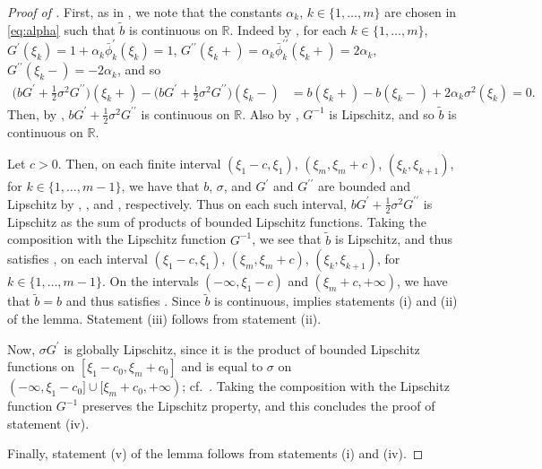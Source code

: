 \documentclass[onseside, final]{amsart}
\theoremstyle{definition}
\newcommand{\R}{\mathbb R}
\numberwithin{equation}{section}
\begin{document}
	\begin{proof}[Proof of ]
	 	First, as in \cite{LeSz17}, we note that the constants $\alpha_k$, $k \in \{1, \dotsc, m\}$ are chosen in \eqref{eq:alpha} such that $\tilde b$ is continuous on $\R$. Indeed by , for each $k \in \{1, \dotsc, m\}$, $G^\prime(\xi_k) = 1 + \alpha_k \bar \phi_k^\prime(\xi_k) = 1$, $G^{\prime \prime}(\xi_k+) = \alpha_k \bar \phi_k^{\prime \prime}(\xi_k+) = 2 \alpha_k$, $G^{\prime \prime}(\xi_k -) = - 2 \alpha_k$, and so
		\begin{equation}
			\begin{split}
				\bigl(b G^\prime + \tfrac12 \sigma^2 G^{\prime \prime}\bigr)(\xi_k+) - \bigl(b G^\prime + \tfrac12 \sigma^2 G^{\prime \prime}\bigr)(\xi_k-) & = b(\xi_k+) - b(\xi_k-) + 2\alpha_k \sigma^2(\xi_k) = 0.
			\end{split}
		\end{equation}
		Then, by , $b G^\prime + \tfrac{1}{2} \sigma^2 G^{\prime \prime}$ is continuous on $\R$. Also by , $G^{-1}$ is Lipschitz, and so $\tilde b$ is continuous on $\R$.
		
		Let $c > 0$. Then, on each finite interval $(\xi_1 - c, \xi_1)$, $(\xi_m, \xi_m + c)$, $(\xi_k, \xi_{k + 1})$, for $k \in \{1, \dotsc, m - 1\}$, we have that $b$, $\sigma$, and $G^\prime$ and $G^{\prime \prime}$ are bounded and Lipschitz by , , and , respectively. Thus on each such interval, $b G^\prime + \tfrac{1}{2} \sigma^2 G^{\prime \prime}$ is Lipschitz as the sum of products of bounded Lipschitz functions. Taking the composition with the Lipschitz function $G^{-1}$, we see that $\tilde b$ is Lipschitz, and thus satisfies , on each interval $(\xi_1 - c, \xi_1)$, $(\xi_m, \xi_m + c)$, $(\xi_k, \xi_{k + 1})$, for $k \in \{1, \dotsc, m - 1\}$. On the intervals $(-\infty, \xi_1 - c)$ and $(\xi_m + c, + \infty)$, we have that $\tilde b = b$ and thus satisfies . Since $\tilde b$ is continuous,  implies statements (i) and (ii) of the lemma. Statement (iii) follows from statement (ii).
		
		Now, $\sigma G^\prime$ is globally Lipschitz, since it is the product of bounded Lipschitz functions on $[\xi_1 - c_0, \xi_m + c_0]$ and is equal to $\sigma$ on $(-\infty, \xi_1 - c_0] \cup [\xi_m + c_0, + \infty)$; cf.\ \cite[Lemma 2.5]{LeSz17}. Taking the composition with the Lipschitz function $G^{-1}$ preserves the Lipschitz property, and this concludes the proof of statement (iv).
		
		Finally, statement (v) of the lemma follows from statements (i) and (iv).
	\end{proof}	



\end{document}
